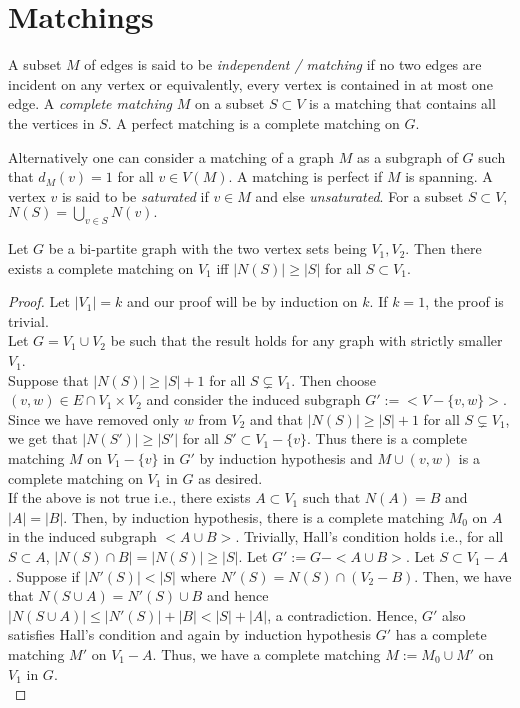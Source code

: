 \documentclass[../basic_graph_theory.tex]{subfiles}
\begin{document}
\chapter{Matchings}
\setcounter{chapter}{5} %
\setcounter{section}{5}
\setcounter{equation}{5}
\setcounter{figure}{5}

\begin{defn} 
    A subset $M$ of edges is said to be {\em independent / matching} if no two edges are incident on any vertex or equivalently, every vertex is contained in at most one edge. A {\em complete matching} $M$ on a subset $S \subset V$ is a matching that contains all the vertices in $S$. A perfect matching is a complete matching on $G$. 
\end{defn}
    Alternatively one can consider a matching of a graph $M$ as a subgraph of $G$ such that $d_M(v) = 1$ for all $v \in V(M)$. A matching is perfect if $M$ is spanning. A vertex $v$ is said to be {\em saturated} if $v \in M$ and else {\em unsaturated}. For a subset $S \subset V$, $N(S) = \bigcup_{v \in S}N(v).$
\begin{thm} 
    Let $G$ be a bi-partite graph with the two vertex sets being $V_1,V_2$.  Then there exists a complete matching on $V_1$ iff $|N(S)| \geq |S|$ for all $S \subset V_1$. 
\end{thm}
\begin{proof}
    Let $|V_1| = k$ and our proof will be by induction on $k$. If $k = 1$, the proof is trivial.\\
    Let $G = V_1 \cup V_2$ be such that the result holds for any graph with strictly smaller $V_1$.\\ 
    Suppose that $|N(S)| \geq |S| + 1$ for all $S \subsetneq V_1$. Then choose $(v,w) \in E \cap V_1 \times V_2$ and consider the induced subgraph $G' := <V - \{v,w\}>$. Since we have removed only $w$ from $V_2$ and that $|N(S)| \geq |S| + 1$ for all $S \subsetneq V_1$, we get that $|N(S')| \geq |S'|$ for all $S' \subset V_1 - \{v\}$. Thus there is a complete matching $M$ on $V_1 - \{v\}$ in $G'$ by induction hypothesis and $M \cup (v,w)$ is a complete matching on $V_1$ in $G$ as desired.\\
    If the above is not true i.e., there exists $A \subset V_1$ such that $N(A) = B$ and $|A| = |B|$. Then, by induction hypothesis, there is a complete matching $M_0$ on $A$ in the induced subgraph $<A \cup B>$. Trivially,  Hall's condition holds i.e., for all $S \subset A$,  $|N(S) \cap B| =  |N(S)| \geq |S|$. Let $G' := G - <A \cup B>$.  Let $S \subset V_1 - A$.  Suppose if $|N'(S)| < |S|$ where $N'(S) = N(S) \cap (V_2 - B)$.  Then,  we have that $N(S \cup A) = N'(S) \cup B$ and hence $|N(S \cup A)| \leq |N'(S)| + |B| < |S| + |A|$,  a contradiction.  Hence, $G'$ also satisfies Hall's condition and again by induction hypothesis $G'$ has a complete matching $M'$ on $V_1 -A$. Thus, we have a complete matching $M := M_0 \cup M'$ on $V_1$ in $G$.\\
\end{proof}
\end{document}
